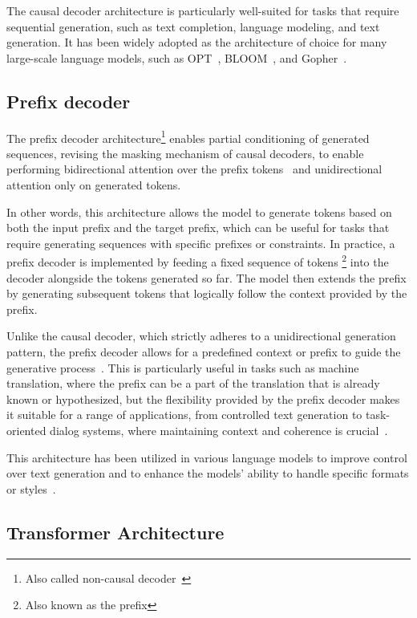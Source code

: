 The causal decoder architecture is particularly well-suited for tasks that require sequential generation, such as text completion, language modeling, and text generation.
It has been widely adopted as the architecture of choice for many large-scale language models, such as OPT~\cite{zhang2022opt}, BLOOM~\cite{workshop2023bloom}, and Gopher~\cite{rae2021scaling}.

\subsection{Prefix decoder}
\label{subsec:prefix-decoder}

The prefix decoder architecture\footnote{Also called non-causal decoder~\cite{zhang2022examining}} enables partial conditioning of generated sequences, revising the masking mechanism of causal decoders, to enable performing bidirectional attention over the prefix tokens~\cite{dong2019unified} and unidirectional attention only on generated tokens.

In other words, this architecture allows the model to generate tokens based on both the input prefix and the target prefix, which can be useful for tasks that require generating sequences with specific prefixes or constraints.
In practice, a prefix decoder is implemented by feeding a fixed sequence of tokens \footnote{Also known as the prefix} into the decoder alongside the tokens generated so far.
The model then extends the prefix by generating subsequent tokens that logically follow the context provided by the prefix.

Unlike the causal decoder, which strictly adheres to a unidirectional generation pattern, the prefix decoder allows for a predefined context or prefix to guide the generative process~\cite{li2021prefixtuning}.
This is particularly useful in tasks such as machine translation, where the prefix can be a part of the translation that is already known or hypothesized, but the flexibility provided by the prefix decoder makes it suitable for a range of applications, from controlled text generation to task-oriented dialog systems, where maintaining context and coherence is crucial~\cite{li2022ptuning}.

This architecture has been utilized in various language models to improve control over text generation and to enhance the models' ability to handle specific formats or styles~\cite{raffel2023exploring}.

\subsection{Transformer Architecture}
\label{subsec:transformer-architecture}

